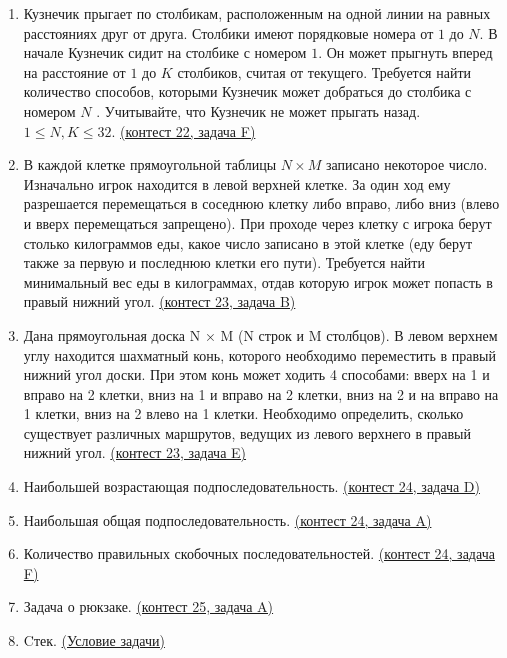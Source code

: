 \documentclass[a4paper,12pt]{article}
\begin{document}
\begin{enumerate}
\item Кузнечик прыгает по столбикам, расположенным на одной линии на равных расстояниях друг от друга. Столбики имеют порядковые номера от $1$ до $N$. В начале Кузнечик сидит на столбике с номером $1$. Он может прыгнуть вперед на расстояние от $1$ до $K$ столбиков, считая от текущего. Требуется найти количество способов, которыми Кузнечик может добраться до столбика с номером $N$ . Учитывайте, что Кузнечик не может прыгать назад. $1 \le N, K \le 32$. \href{https://informatics.msk.ru/mod/statements/view3.php?chapterid=112603}{(контест 22, задача F)}
\item В каждой клетке прямоугольной таблицы $N\times M$ записано некоторое число. Изначально игрок находится в левой верхней клетке. За один ход ему разрешается перемещаться в соседнюю клетку либо вправо, либо вниз (влево и вверх перемещаться запрещено). При проходе через клетку с игрока берут столько килограммов еды, какое число записано в этой клетке (еду берут также за первую и последнюю клетки его пути). Требуется найти минимальный вес еды в килограммах, отдав которую игрок может попасть в правый нижний угол. \href{https://informatics.msk.ru/mod/statements/view3.php?chapterid=944}{(контест 23, задача B)}
\item Дана прямоугольная доска N × M (N строк и M столбцов). В левом верхнем углу находится шахматный конь, которого необходимо переместить в правый нижний угол доски. При этом конь может ходить 4 способами: вверх на 1 и вправо на 2 клетки, вниз на 1 и вправо на 2 клетки, вниз на 2 и на вправо на 1 клетки, вниз на 2 влево на 1 клетки. Необходимо определить, сколько существует различных маршрутов, ведущих из левого верхнего в правый нижний угол. \href{https://informatics.msk.ru/mod/statements/view3.php?chapterid=2962}{(контест 23, задача E)}
\item Наибольшей возрастающая подпоследовательность. \href{https://informatics.msk.ru/mod/statements/view3.php?chapterid=205}{(контест 24, задача D)}
\item Наибольшая общая подпоследовательность. \href{https://informatics.msk.ru/mod/statements/view3.php?chapterid=204}{(контест 24, задача A)}
\item Количество правильных скобочных последовательностей. \href{https://informatics.msk.ru/mod/statements/view3.php?chapterid=3005}{(контест 24, задача F)}
\item Задача о рюкзаке. \href{https://informatics.msk.ru/mod/statements/view3.php?chapterid=3089}{(контест 25, задача A)}
\item Cтек. \href{https://informatics.msk.ru/mod/statements/view3.php?chapterid=54}{(Условие задачи)}

\end{enumerate}
\end{document}
